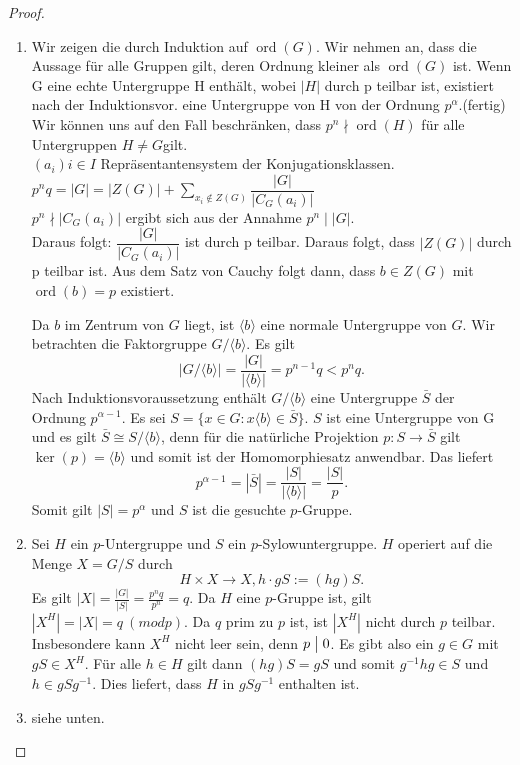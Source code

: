 \documentclass[12pt]{scrartcl} %
\DeclareMathOperator{\ord}{ord}
\newcommand{\divides}{\bigm|}
\theoremstyle{definition}
\theoremstyle{remark}
\begin{document}
\begin{proof}
\begin{enumerate}
\item Wir zeigen die durch Induktion auf $\ord(G)$.
Wir nehmen an, dass die Aussage für alle Gruppen gilt, deren Ordnung kleiner als \(\ord(G)\) ist.
Wenn G eine echte Untergruppe H enthält, wobei $|H|$ durch p teilbar ist, existiert nach der Induktionsvor. eine Untergruppe von H von der Ordnung $p^\alpha$.(fertig) \\
Wir können uns auf den Fall beschränken, dass $p^n \nmid \ord(H)$ für alle Untergruppen $H\neq G$gilt. \\
$(a_{i}){i \in I}$ Repräsentantensystem der Konjugationsklassen. \\
$p^n q=|G|=|Z(G)|+\sum_{x_{i}\notin Z(G)}\dfrac{|G|}{|C_{G}(a_{i})|}$ \\
$p^n \nmid |C_{G}(a_{i})|$ ergibt sich aus der Annahme $p^n \mid |G|$. \\
Daraus folgt: $\dfrac{|G|}{|C_{G}(a_{i})|}$ ist durch p teilbar. Daraus folgt, dass $|Z(G)|$ durch p teilbar ist. Aus dem Satz von Cauchy folgt dann, dass $b \in Z(G)$ mit $\ord(b)=p$ existiert.

Da $b$ im Zentrum von $G$ liegt, ist $\langle b \rangle$ eine normale Untergruppe von $G$. Wir betrachten die Faktorgruppe $G/ \langle b \rangle$. Es gilt
	$$ |G/ \langle b \rangle | = \frac{|G|}{| \langle b \rangle |} = p^{n-1}q < p^nq. $$
	Nach Induktionsvoraussetzung enthält $G / \langle b \rangle$ eine Untergruppe $\bar{S}$ der Ordnung $p^{\alpha - 1}$. Es sei $S = \{ x \in G : x \langle b \rangle \in \bar{S} \}$. $S$ ist eine Untergruppe von G und es gilt $ \bar{S} \cong S/ \langle b \rangle$, denn für die natürliche Projektion $p: S \rightarrow \bar{S}$ gilt $\ker(p) = \langle b \rangle$ und somit ist der Homomorphiesatz anwendbar.
	Das liefert
	$$ p^{\alpha - 1} = |\bar{S}| = \frac{|S|}{| \langle b \rangle |} = \frac{|S|}{p}. $$
	Somit gilt $|S| = p^{\alpha}$ und $S$ ist die gesuchte $p$-Gruppe.
	
	\item Sei $H$ ein $p$-Untergruppe und $S$ ein $p$-Sylowuntergruppe. $H$ operiert auf die Menge $X = G/S$ durch
	$$ H \times X \rightarrow X, h \cdot gS := (hg)S.$$
	Es gilt $|X| = \frac{|G|}{|S|} = \frac{p^nq}{p^n} = q$. Da $H$ eine $p$-Gruppe ist, gilt $|X^H| = |X| = q \ (modp)$. Da $q$ prim zu $p$ ist, ist $|X^H|$ nicht durch $p$ teilbar. Insbesondere kann $X^H$ nicht leer sein, denn $p \divides 0$. Es gibt also ein $g \in G$ mit $gS \in X^H$. Für alle $h \in H$ gilt dann $(hg)S = gS$ und somit $g^{-1}hg \in S$ und $h \in gSg^{-1}$. Dies liefert, dass $H$ in $gSg^{-1}$ enthalten ist.
	
	\item siehe unten.
\end{enumerate}
\end{proof}
\end{document}
